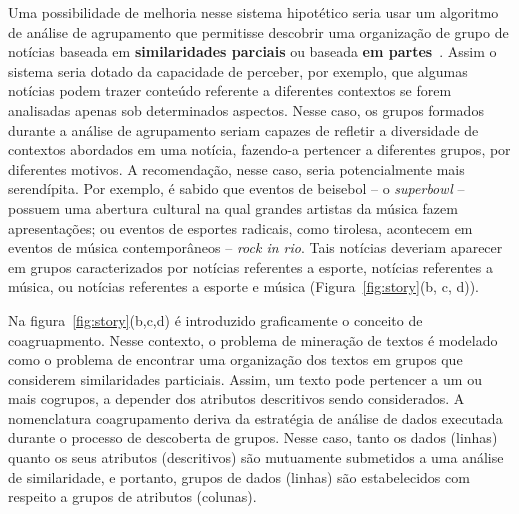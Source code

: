 \documentclass[
    12pt,                %
    oneside,            %
    a4paper,            %
    english,            %
    brazil                %
    ]{abntex2ppgsi}
\begin{document}
Uma possibilidade de melhoria nesse sistema hipotético seria usar um algoritmo de análise de agrupamento que permitisse descobrir uma organização de grupo de notícias baseada em \textbf{similaridades parciais} ou baseada \textbf{em partes}~\cite{Franca2010, Ho2008}. Assim o sistema seria dotado da capacidade de perceber, por exemplo, que algumas notícias podem trazer conteúdo referente a diferentes contextos se forem analisadas apenas sob determinados aspectos. Nesse caso, os grupos formados durante a análise de agrupamento seriam capazes de refletir a diversidade de contextos abordados em uma notícia, fazendo-a pertencer a diferentes grupos, por diferentes motivos. A recomendação, nesse caso, seria potencialmente mais serendípita. Por exemplo, é sabido que eventos de beisebol -- o \textit{superbowl} -- possuem uma abertura cultural na qual grandes artistas da música fazem apresentações; ou eventos de esportes radicais, como tirolesa, acontecem em eventos de música contemporâneos -- \textit{rock in rio}. Tais notícias deveriam aparecer em grupos caracterizados por notícias referentes a esporte, notícias referentes a música, ou notícias referentes a esporte e música (Figura~\ref{fig:story}(b, c, d)).


Na figura~\ref{fig:story}(b,c,d) é introduzido graficamente o conceito de coagruapmento. Nesse contexto, o problema de mineração de textos é modelado como o problema de encontrar uma organização dos textos em grupos que considerem similaridades particiais. Assim, um texto pode pertencer a um ou mais cogrupos, a depender dos atributos descritivos sendo considerados. A nomenclatura coagrupamento deriva da estratégia de análise de dados executada durante o processo de descoberta de grupos. Nesse caso, tanto os dados (linhas) quanto os seus atributos (descritivos) são mutuamente submetidos a uma análise de similaridade, e portanto, grupos de dados (linhas) são estabelecidos com respeito a grupos de atributos (colunas).


\end{document}
